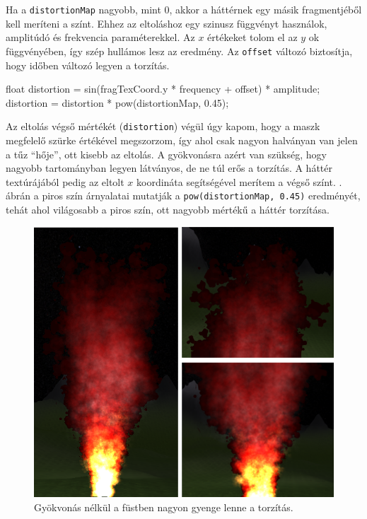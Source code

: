 Ha a \texttt{distortionMap} nagyobb, mint $0$, akkor a háttérnek egy másik fragmentjéből kell meríteni a színt. Ehhez az eltoláshoz egy szinusz függvényt használok, amplitúdó és frekvencia paraméterekkel. Az $x$ értékeket tolom el az $y$ ok függvényében, így szép hullámos lesz az eredmény. Az \texttt{offset} változó biztosítja, hogy időben változó legyen a torzítás.
\begin{cpp}
float distortion = sin(fragTexCoord.y * frequency + offset) * amplitude;
distortion = distortion * pow(distortionMap, 0.45);
\end{cpp}
Az eltolás végső mértékét (\texttt{distortion}) végül úgy kapom, hogy a maszk megfelelő szürke értékével megszorzom, így ahol csak nagyon halványan van jelen a tűz ``hője'', ott kisebb az eltolás. A gyökvonásra azért van szükség, hogy nagyobb tartományban legyen látványos, de ne túl erős a torzítás. A háttér textúrájából pedig az eltolt $x$ koordináta segítségével merítem a végső színt. . ábrán a piros szín árnyalatai mutatják a \texttt{pow(distortionMap, 0.45)} eredményét, tehát ahol világosabb a piros szín, ott nagyobb mértékű a háttér torzítása.

\begin{figure}[h]
 \centering
 \includegraphics[width=\textwidth]{kepek/redDistortion.png}
 \caption{Gyökvonás nélkül a füstben nagyon gyenge lenne a torzítás.}
 \label{fig:redDistortion}
\end{figure}

